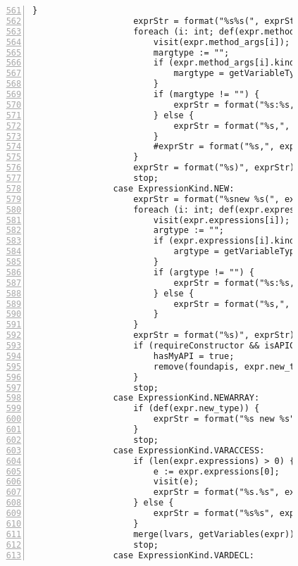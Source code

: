 \begin{figure}[ht!]
\begin{lstlisting}[numbers=left, tabsize=4, escapechar=@, caption={API Usage Mining Analysis},label={lst:aun-code},  firstline = 561, firstnumber = 561, lastline = 621]
                    }
                    exprStr = format("%s%s(", exprStr, expr.method);
                    foreach (i: int; def(expr.method_args[i])) {
                        visit(expr.method_args[i]);  
                        margtype := "";
                        if (expr.method_args[i].kind == ExpressionKind.VARACCESS) {
                            margtype = getVariableType(expr.method_args[i].variable, false);
                        }
                        if (margtype != "") {
                            exprStr = format("%s:%s,", exprStr, margtype);
                        } else {
                            exprStr = format("%s,", exprStr);    
                        }
                        #exprStr = format("%s,", exprStr);
                    }
                    exprStr = format("%s)", exprStr);
                    stop;
                case ExpressionKind.NEW:
                    exprStr = format("%snew %s(", exprStr, expr.new_type.name);
                    foreach (i: int; def(expr.expressions[i])) {
                        visit(expr.expressions[i]);  
                        argtype := "";
                        if (expr.expressions[i].kind == ExpressionKind.VARACCESS) {
                            argtype = getVariableType(expr.expressions[i].variable, false);
                        }
                        if (argtype != "") {
                            exprStr = format("%s:%s,", exprStr, argtype);
                        } else {
                            exprStr = format("%s,", exprStr);    
                        }
                    }
                    exprStr = format("%s)", exprStr);
                    if (requireConstructor && isAPIConstructor(expr.new_type.name)) {
                        hasMyAPI = true;
                        remove(foundapis, expr.new_type.name);
                    }
                    stop;
                case ExpressionKind.NEWARRAY:
                    if (def(expr.new_type)) {
                        exprStr = format("%s new %s", exprStr, expr.new_type.name);
                    }
                    stop;
                case ExpressionKind.VARACCESS:
                    if (len(expr.expressions) > 0) {
                        e := expr.expressions[0];
                        visit(e);
                        exprStr = format("%s.%s", exprStr, expr.variable);
                    } else {
                        exprStr = format("%s%s", exprStr, expr.variable);
                    }
                    merge(lvars, getVariables(expr));
                    stop;
                case ExpressionKind.VARDECL:

\end{lstlisting}
\end{figure}
